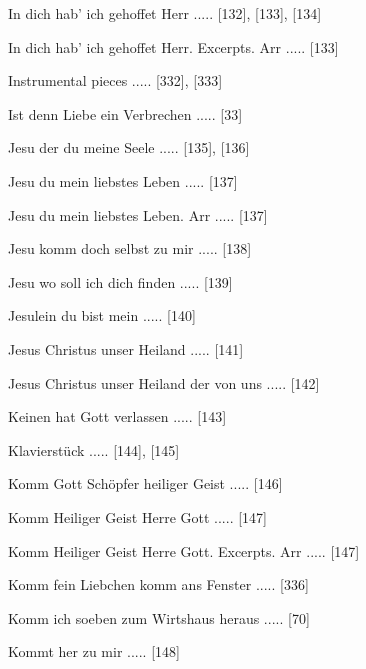 \documentclass[twocolumn, 12pt]{book}
\begin{document}
\newline 
In dich hab' ich gehoffet Herr ..... [132], [133], [134]

\newline 
In dich hab' ich gehoffet Herr. Excerpts. Arr ..... [133]

\newline 
Instrumental pieces ..... [332], [333]

\newline 
Ist denn Liebe ein Verbrechen ..... [33]

\newline 
Jesu der du meine Seele ..... [135], [136]

\newline 
Jesu du mein liebstes Leben ..... [137]

\newline 
Jesu du mein liebstes Leben. Arr ..... [137]

\newline 
Jesu komm doch selbst zu mir ..... [138]

\newline 
Jesu wo soll ich dich finden ..... [139]

\newline 
Jesulein du bist mein ..... [140]

\newline 
Jesus Christus unser Heiland ..... [141]

\newline 
Jesus Christus unser Heiland der von uns ..... [142]

\newline 
Keinen hat Gott verlassen ..... [143]

\newline 
Klavierstück ..... [144], [145]

\newline 
Komm Gott Schöpfer heiliger Geist ..... [146]

\newline 
Komm Heiliger Geist Herre Gott ..... [147]

\newline 
Komm Heiliger Geist Herre Gott. Excerpts. Arr ..... [147]

\newline 
Komm fein Liebchen komm ans Fenster ..... [336]

\newline 
Komm ich soeben zum Wirtshaus heraus ..... [70]

\newline 
Kommt her zu mir ..... [148]
\end{document}
